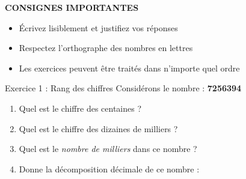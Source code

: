 

\begin{center}
	\quad
	\quad
	\quad
	\quad
\end{center}

\vspace{0.2cm}
\begin{consignebox}
	 \textbf{CONSIGNES IMPORTANTES}
	\begin{itemize}[leftmargin=*,noitemsep,topsep=5pt]
		\item[\faIcon{check}] Écrivez lisiblement et justifiez vos réponses
		\item[\faIcon{check}] Respectez l'orthographe des nombres en lettres
		\item[\faIcon{check}] Les exercices peuvent être traités dans n'importe quel ordre
	\end{itemize}
\end{consignebox}

\vspace{0.5cm}
\begin{exercisebox}{ Exercice 1 : Rang des chiffres }
	Considérons le nombre : \textbf{\num{7256394}}
	
	\begin{enumerate}[label=\textcolor{primary}{\textbf{\alph*)}},leftmargin=*]
		\item Quel est le chiffre des centaines ? \dotfill {} 
		\item Quel est le chiffre des dizaines de milliers ? \dotfill {} 
		\item Quel est le \emph{nombre de milliers} dans ce nombre ? \dotfill {} 
		\item Donne la décomposition décimale de ce nombre : 
	\end{enumerate}
\end{exercisebox}

